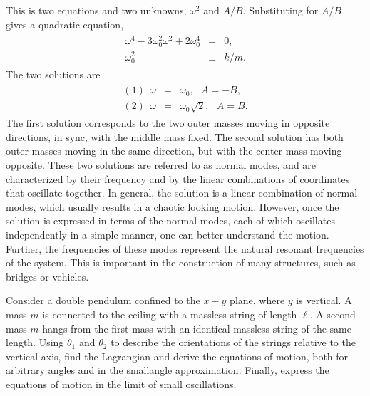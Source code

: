 \documentclass[letterpaper,10pt,english]{sphinxmanual}
\begin{document}
This is two equations and two unknowns, \(\omega^2\) and
\(A/B\). Substituting for \(A/B\) gives a quadratic equation,
\begin{equation*}
\begin{split}
\begin{eqnarray*}
\omega^4-3\omega_0^2\omega^2+2\omega_0^4&=&0,\\
\omega_0^2&\equiv&k/m.
\end{eqnarray*}
\end{split}
\end{equation*}
The two solutions are
\begin{equation*}
\begin{split}
\begin{eqnarray*}
(1)~~\omega&=&\omega_0,~~~A=-B,\\
(2)~~\omega&=&\omega_0\sqrt{2},~~~A=B.
\end{eqnarray*}
\end{split}
\end{equation*}
The first solution corresponds to the two outer masses moving in
opposite directions, in sync, with the middle mass fixed. The second
solution has both outer masses moving in the same direction, but with
the center mass moving opposite. These two solutions are referred to
as normal modes, and are characterized by their frequency and by the
linear combinations of coordinates that oscillate together. In
general, the solution is a linear combination of normal modes, which
usually results in a chaotic looking motion. However, once the
solution is expressed in terms of the normal modes, each of which
oscillates independently in a simple manner, one can better understand
the motion. Further, the frequencies of these modes represent the
natural resonant frequencies of the system. This is important in the
construction of many structures, such as bridges or vehicles.

Consider a double pendulum confined to the \(x-y\) plane, where \(y\) is
vertical. A mass \(m\) is connected to the ceiling with a massless
string of length \(\ell\). A second mass \(m\) hangs from the first mass
with an identical massless string of the same length. Using \(\theta_1\)
and \(\theta_2\) to describe the orientations of the strings relative to
the vertical axis, find the Lagrangian and derive the equations of
motion, both for arbitrary angles and in the small\sphinxhyphen{}angle
approximation. Finally, express the equations of motion in the limit
of small oscillations.
\end{document}
